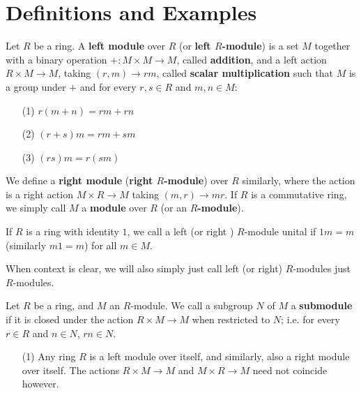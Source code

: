 \section{Definitions and Examples}

\begin{definition}
  Let $R$ be a ring. A  \textbf{left module} over $R$ (or \textbf{left
  $R$-module}) is a set $M$ together with a binary operation $+:M
  \times M \xrightarrow{} M$, called \textbf{addition}, and a left
  action $R \times M \xrightarrow{} M$, taking $(r,m) \xrightarrow{}
  rm$, called \textbf{scalar multiplication} such that $M$ is a group
  under $+$ and for every $r,s \in R$ and $m,n \in M$:
  \begin{enumerate}
    \item[(1)] $r(m+n)=rm+rn$

    \item[(2)] $(r+s)m=rm+sm$

    \item[(3)] $(rs)m=r(sm)$
  \end{enumerate}
   We define a \textbf{right module} (\textbf{right $R$-module}) over
   $R$ similarly, where the action is a right action  $M \times R
   \xrightarrow{} M$ taking $(m,r) \xrightarrow{} mr$. If $R$ is
   a commutative ring, we simply call $M$ a \textbf{module} over
   $R$ (or an \textbf{$R$-module}).

\begin{definition}
  If $R$ is a ring with identity $1$, we call a left (or right )
  $R$-module unital if $1m=m$ (similarly $m1=m$) for all $m \in M$.
\end{definition}

\begin{note}
  When context is clear, we will also simply just call left (or right)
  $R$-modules just $R$-modules.
\end{note}

\begin{definition}
  Let $R$ be a ring, and $M$ an $R$-module. We call a subgroup $N$ of
  $M$ a  \textbf{submodule} if it is closed under the action $R \times
  M \xrightarrow{} M$ when restricted to $N$; i.e. for every  $r \in
  R$ and $n \in N$, $rn \in N$.
\end{definition}

\begin{example}\label{example_4.1}
  \begin{enumerate}
    \item[(1)] Any ring $R$ is a left module over itself, and
      similarly, also a right module over itself. The actions $R
      \times M \xrightarrow{} M$ and $M \times R \xrightarrow{} M$
      need not coincide however.


\end{enumerate}
\end{example}
\end{definition}

